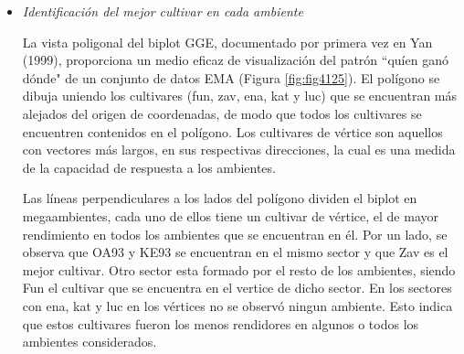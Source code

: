 \begin{itemize}[wide, nosep, labelindent = 0pt,  noitemsep, topsep=0pt]


\item \emph{Identificación del mejor cultivar en cada ambiente}

La vista poligonal del biplot GGE, documentado por primera vez en Yan (1999), proporciona un medio eficaz de visualización del patrón ``quíen ganó dónde" de un conjunto de datos EMA (Figura \ref{fig:fig4125}). 
El polígono se dibuja uniendo los cultivares (fun, zav, ena, kat y luc) que se encuentran más alejados del origen de coordenadas, de modo que todos los cultivares se encuentren contenidos en el polígono. Los cultivares de vértice son aquellos con  vectores más largos, en sus respectivas direcciones, la cual es una medida de la capacidad de respuesta a los ambientes. 

Las líneas perpendiculares a los lados del polígono dividen el biplot en megaambientes, cada uno de ellos tiene un cultivar de vértice, el de mayor rendimiento en todos los ambientes que se encuentran en él. Por un lado, se observa que OA93 y KE93 se encuentran en el mismo sector y que Zav es el mejor cultivar. Otro sector esta formado por el resto de los ambientes, siendo Fun el cultivar que se encuentra en el vertice de dicho sector. En los sectores con ena, kat y luc en los vértices no se observó ningun ambiente. Esto indica que estos cultivares fueron los menos rendidores en algunos o todos los ambientes considerados.


\end{itemize}
